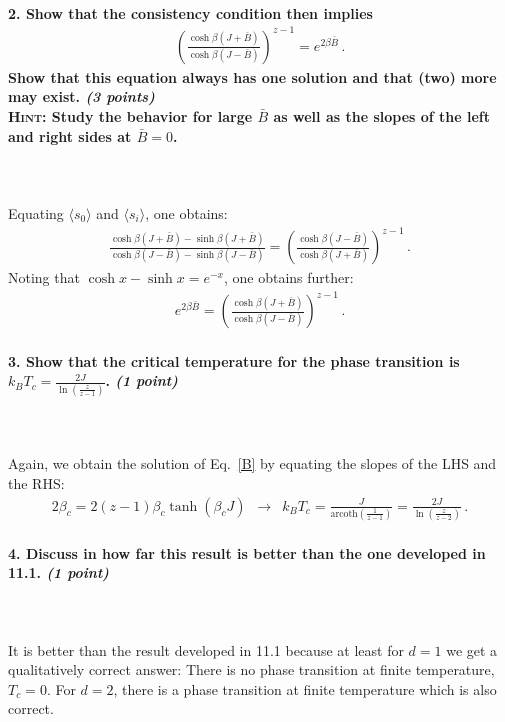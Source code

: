 \newpage

\paragraph{2. Show that the consistency condition then implies
\begin{align}
	\left(\frac{\cosh\beta(J+\bar{B})}{\cosh\beta(J-\bar{B})}\right)^{z-1}=e^{2\beta\bar{B}} \,.
\end{align}
Show that this equation always has one solution and that (two) more may exist. \textit{(3 points)} \\
\textsc{Hint}: Study the behavior for large $\bar{B}$
as well as the slopes of the left and right sides at $\bar{B}=0$.
} \ \\
\\
Equating $\langle s_0 \rangle$ and $\langle s_i \rangle$, one obtains:
\begin{align}
	\frac{\cosh\beta(J+\bar{B}) - \sinh\beta(J+\bar{B})}{\cosh\beta(J-\bar{B}) - \sinh\beta(J-\bar{B})}
	=  \left( \frac{\cosh\beta(J-\bar{B})}{\cosh\beta(J+\bar{B})} \right)^{z-1} \,.
\end{align}
Noting that $\cosh x - \sinh x = e^{-x}$, one obtains further:
\begin{align}
	\label{B}
	e^{2\beta \bar{B}}
	=  \left( \frac{\cosh\beta(J+\bar{B})}{\cosh\beta(J-\bar{B})} \right)^{z-1} \,.
\end{align}


\paragraph{3. Show that the critical temperature for the phase transition is 
$k_B T_c = \frac{2J}{\ln(\frac{z}{z-1})}$. \textit{(1 point)}
} \ \\
\\
Again, we obtain the solution of Eq.~\eqref{B} by equating the slopes of the LHS and the RHS:
\begin{align}
	\label{B}
	2\beta_c =  2 (z-1) \beta_c \tanh(\beta_c J) \, \, \, \rightarrow \, \, \,
	k_B T_c = \frac{J}{\text{arcoth}(\frac{1}{z-1})} = \frac{2J}{\ln(\frac{z}{z-2})} \,.
\end{align}


\paragraph{4. Discuss in how far this result is better than the one developed in 11.1. \textit{(1 point)}
} \ \\
\\
It is better than the result developed in 11.1 because at least for $d=1$ we get a qualitatively correct answer:
There is no phase transition at finite temperature, $T_c=0$. For $d=2$, there is a phase transition at finite 
temperature which is also correct.